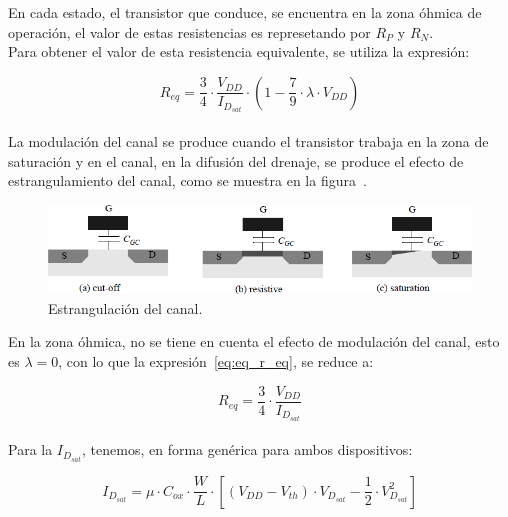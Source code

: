 En cada estado, el transistor que conduce, se encuentra en la zona óhmica de operación, el valor de estas resistencias es represetando por $R_{P}$ y $R_{N}$. \\



Para obtener el valor de esta resistencia equivalente, se utiliza la expresión:


\begin{equation}
R_{eq} = \frac{3}{4} \cdot \frac{V_{DD}}{I_{D_{sat}}} \cdot \left( 1 - \frac{7}{9} \cdot \lambda \cdot V_{DD} \right)
\label{eq:eq_r_eq}
\end{equation} \\



La modulación del canal se produce cuando el transistor trabaja en la zona de saturación y en el canal, en la difusión del drenaje, se produce el efecto de  estrangulamiento del canal, como se muestra en la figura~.



\begin{figure}[H] %
\begin{center}
\includegraphics[width=0.7 \textwidth, angle=0]{./img/point1/channel_strangulation}
\caption{\label{fig:fig_channel_strangulation}\footnotesize{Estrangulación del canal.}}
\end{center}
\end{figure}


En la zona óhmica, no se tiene en cuenta el efecto de modulación del canal, esto es $\lambda = 0$, con lo que la expresión~\eqref{eq:eq_r_eq}, se reduce a:


\begin{equation}
R_{eq} = \frac{3}{4} \cdot \frac{V_{DD}}{I_{D_{sat}}}
\label{eq:eq_r_eq_red}
\end{equation} \\


Para la $I_{D_{sat}}$, tenemos, en forma genérica para ambos dispositivos:

\begin{equation}
I_{D_{sat}} = \mu \cdot C_{ox} \cdot \frac{W}{L} \cdot \left[ \left( V_{DD} - V_{th} \right) \cdot V_{D_{sat}} - \frac{1}{2} \cdot V_{D_{sat}}^2 \right]
\end{equation} \\


